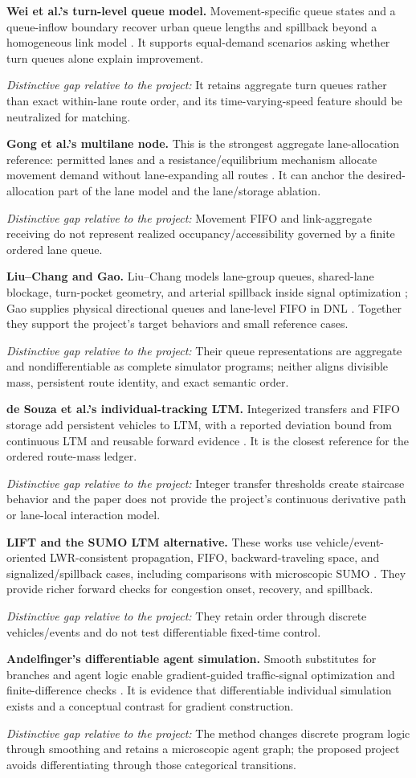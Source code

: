 \documentclass[11pt,a4paper]{article}
\newcommand{\gap}[1]{\par\smallskip\noindent\textit{Distinctive gap relative to the project:} #1}
\begin{document}
\textbf{Wei et al.'s turn-level queue model.} Movement-specific queue states and a queue-inflow boundary recover urban queue lengths and spillback beyond a homogeneous link model \cite{wei2025}. It supports equal-demand scenarios asking whether turn queues alone explain improvement. \gap{It retains aggregate turn queues rather than exact within-lane route order, and its time-varying-speed feature should be neutralized for matching.}

\textbf{Gong et al.'s multilane node.} This is the strongest aggregate lane-allocation reference: permitted lanes and a resistance/equilibrium mechanism allocate movement demand without lane-expanding all routes \cite{gong2025}. It can anchor the desired-allocation part of the lane model and the lane/storage ablation. \gap{Movement FIFO and link-aggregate receiving do not represent realized occupancy/accessibility governed by a finite ordered lane queue.}

\textbf{Liu--Chang and Gao.} Liu--Chang models lane-group queues, shared-lane blockage, turn-pocket geometry, and arterial spillback inside signal optimization \cite{liu2011}; Gao supplies physical directional queues and lane-level FIFO in DNL \cite{gao2012}. Together they support the project's target behaviors and small reference cases. \gap{Their queue representations are aggregate and nondifferentiable as complete simulator programs; neither aligns divisible mass, persistent route identity, and exact semantic order.}

\textbf{de Souza et al.'s individual-tracking LTM.} Integerized transfers and FIFO storage add persistent vehicles to LTM, with a reported deviation bound from continuous LTM and reusable forward evidence \cite{desouza2025}. It is the closest reference for the ordered route-mass ledger. \gap{Integer transfer thresholds create staircase behavior and the paper does not provide the project's continuous derivative path or lane-local interaction model.}

\textbf{LIFT and the SUMO LTM alternative.} These works use vehicle/event-oriented LWR-consistent propagation, FIFO, backward-traveling space, and signalized/spillback cases, including comparisons with microscopic SUMO \cite{nietal2026,nisumo2026}. They provide richer forward checks for congestion onset, recovery, and spillback. \gap{They retain order through discrete vehicles/events and do not test differentiable fixed-time control.}

\textbf{Andelfinger's differentiable agent simulation.} Smooth substitutes for branches and agent logic enable gradient-guided traffic-signal optimization and finite-difference checks \cite{andelfinger2021}. It is evidence that differentiable individual simulation exists and a conceptual contrast for gradient construction. \gap{The method changes discrete program logic through smoothing and retains a microscopic agent graph; the proposed project avoids differentiating through those categorical transitions.}
\end{document}
